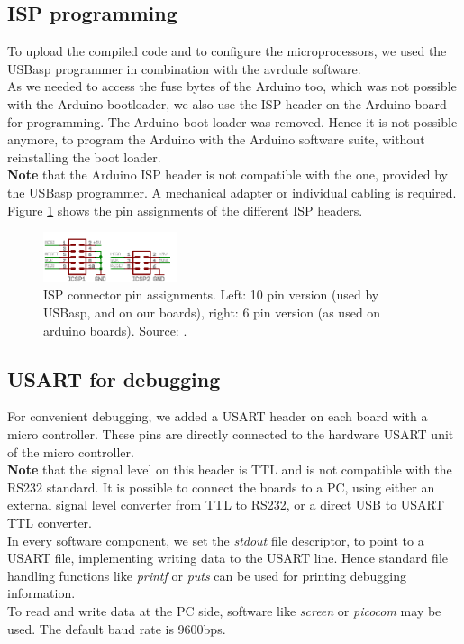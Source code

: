 \documentclass[a4paper]{scrreprt}
\begin{document}
\subsection{ISP programming}\label{chap:isp}
To upload the compiled code and to configure the microprocessors, we used the USBasp programmer in combination with the avrdude software.\\
As we needed to access the fuse bytes of the Arduino too, which was not possible with the Arduino bootloader, we also use the ISP header on the Arduino board for programming. The Arduino boot loader was removed. Hence it is not possible anymore, to program the Arduino with the Arduino software suite, without reinstalling the boot loader.\\
\textbf{Note} that the Arduino ISP header is not compatible with the one, provided by the USBasp programmer. A mechanical adapter or individual cabling is required. 
Figure \ref{fig:isp} shows the pin assignments of the different ISP headers.
\begin{figure}[htbp]
	\centering
	\includegraphics[width=0.35\textwidth]{img/isp.png}
  \caption{ISP connector pin assignments. Left: 10 pin version (used by USBasp, and on our boards), right: 6 pin version (as used on arduino boards). Source: \cite{micronet}.}
	\label{fig:isp}
\end{figure}
\subsection{USART for debugging}
For convenient debugging, we added a USART header on each board with a micro controller. 
These pins are directly connected to the hardware USART unit of the micro controller.\\ 
\textbf{Note} that the signal level on this header is TTL and is not compatible with the RS232 standard. It is possible to connect the boards to a PC, using either an external signal level converter from TTL to RS232, or a direct USB to USART TTL converter.\\
In every software component, we set the \emph{stdout} file descriptor, to point to a USART file, implementing writing data to the USART line.
Hence standard file handling functions like \emph{printf} or \emph{puts} can be used for printing debugging information.\\
To read and write data at the PC side, software like \emph{screen} or \emph{picocom} may be used. The default baud rate is 9600bps.
\end{document}

